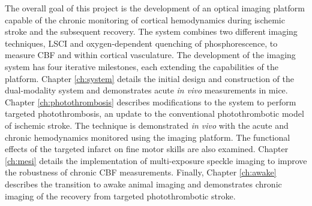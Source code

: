 The overall goal of this project is the development of an optical imaging platform capable of the chronic monitoring of cortical hemodynamics during ischemic stroke and the subsequent recovery. The system combines two different imaging techniques, LSCI and oxygen-dependent quenching of phosphorescence, to measure CBF and  within cortical vasculature. The development of the imaging system has four iterative milestones, each extending the capabilities of the platform. Chapter \ref{ch:system} details the initial design and construction of the dual-modality system and demonstrates acute \textit{in vivo} measurements in mice. Chapter \ref{ch:photothrombosis} describes modifications to the system to perform targeted photothrombosis, an update to the conventional photothrombotic model of ischemic stroke. The technique is demonstrated \textit{in vivo} with the acute and chronic hemodynamics monitored using the imaging platform. The functional effects of the targeted infarct on fine motor skills are also examined. Chapter \ref{ch:mesi} details the implementation of multi-exposure speckle imaging to improve the robustness of chronic CBF measurements. Finally, Chapter \ref{ch:awake} describes the transition to awake animal imaging and demonstrates chronic imaging of the recovery from targeted photothrombotic stroke.



